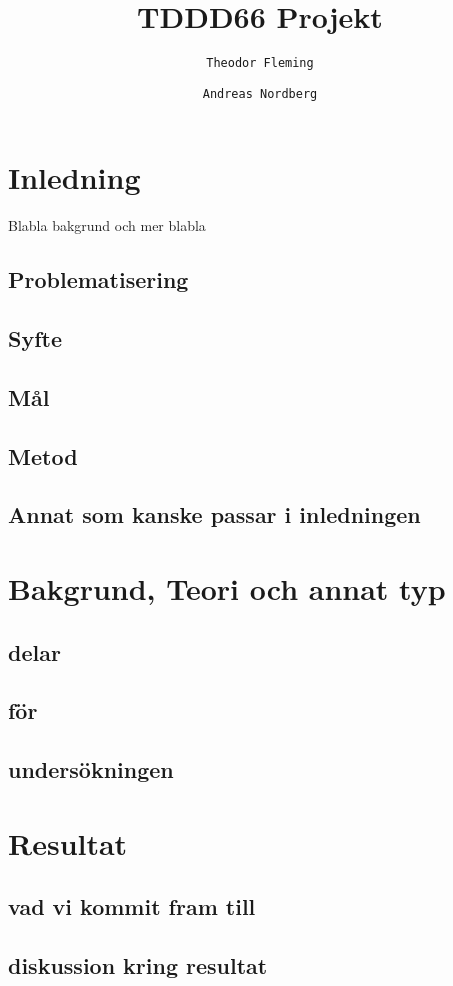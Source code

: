 \documentclass[10pt,a4paper]{article}
\author{
  \texttt{Theodor Fleming}
  \and
  \texttt{Andreas Nordberg}
}
\begin{document}

\title{TDDD66 Projekt}
\maketitle

\cleardoublepage

\section{Inledning}

Blabla bakgrund och mer blabla

\subsection{Problematisering}

\subsection{Syfte}

\subsection{Mål}

\subsection{Metod}

\subsection{Annat som kanske passar i inledningen}

\newpage

\section{Bakgrund, Teori och annat typ}

\subsection{delar}

\subsection{för}

\subsection{undersökningen}

\newpage

\section{Resultat}

\subsection{vad vi kommit fram till}

\subsection{diskussion kring resultat}
\end{document}
